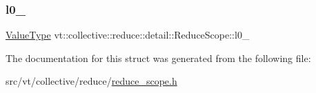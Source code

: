 \subsubsection{\texorpdfstring{l0\+\_\+}{l0\_}}
{\footnotesize\ttfamily \hyperlink{structvt_1_1collective_1_1reduce_1_1detail_1_1_reduce_scope_a7abcfd8ab86f38734725fe77455e4838}{Value\+Type} vt\+::collective\+::reduce\+::detail\+::\+Reduce\+Scope\+::l0\+\_\+\hspace{0.3cm}{\ttfamily [private]}}



The documentation for this struct was generated from the following file\+:\begin{DoxyCompactItemize}
\item 
src/vt/collective/reduce/\hyperlink{reduce__scope_8h}{reduce\+\_\+scope.\+h}\end{DoxyCompactItemize}
